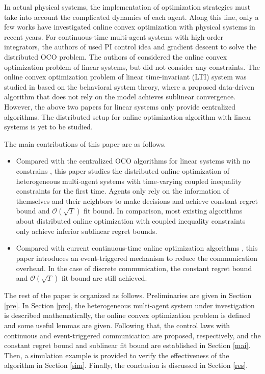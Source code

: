 \documentclass[letterpaper, 10 pt, conference]{ieeeconf}  %
\begin{document}

In actual physical systems, the implementation of optimization strategies must take into account the complicated dynamics of each agent. Along this line, only a few works have investigated online convex optimization with physical systems in recent years. 
For continuous-time multi-agent systems with high-order integrators, the authors of \cite{deng2016} used PI control idea and gradient descent to solve the distributed OCO problem. The authors of \cite{non2020} considered the online convex optimization problem of linear systems, but did not consider any constraints. The online convex optimization problem of linear time-invariant (LTI) system was studied in \cite{non2021} based on the behavioral system theory, where a proposed data-driven algorithm that does not rely on the model achieves sublinear convergence. However, the above two papers for linear systems only provide centralized algorithms. The distributed setup for online optimization algorithm with linear systems is yet to be studied. 

The main contributions of this paper are as follows.
\begin{itemize}
	\item Compared with the centralized OCO algorithms for linear systems with no constrains \cite{non2020,non2021}, this paper studies the distributed online optimization of heterogeneous multi-agent systems with time-varying coupled inequality constraints for the first time. Agents only rely on the information of themselves and their neighbors to make decisions and achieve constant regret bound and $\mathcal{O}(\sqrt{T})$ fit bound. In comparison, most existing algorithms \cite{yi2020,li2022} about distributed online optimization with coupled inequality constraints only achieve inferior sublinear regret bounds.
	\item Compared with current continuous-time online optimization algorithms \cite{deng2016, lee2016, pater2020}, this paper introduces an event-triggered mechanism to reduce the communication overhead. In the case of discrete communication, the constant regret bound and $\mathcal{O}(\sqrt{T})$ fit bound are still achieved.
\end{itemize}


The rest of the paper is organized as follows. Preliminaries are given in Section \ref{pre}. In Section \ref{pro}, the heterogeneous multi-agent system under investigation is described mathematically, the online convex optimization problem is defined and some useful lemmas are given. Following that, the control laws with continuous and event-triggered communication are proposed, respectively, and the constant regret bound and sublinear fit bound are established in Section \ref{mai}. Then, a simulation example is provided to verify the effectiveness of the algorithm in Section \ref{sim}. Finally, the conclusion is discussed in Section \ref{res}.
\end{document}
